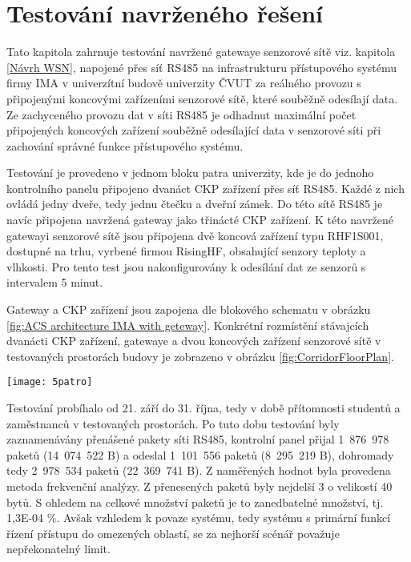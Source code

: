 \chapter{Testování navrženého řešení}
Tato kapitola zahrnuje testování navržené gatewaye senzorové sítě viz. kapitola \ref{Návrh WSN}, napojené přes síť RS485 na infrastrukturu přístupového systému firmy IMA v univerzítní budově univerzity ČVUT za reálného provozu s připojenými koncovými zařízeními senzorové sítě, které souběžně odesílají data. Ze zachyceného provozu dat v síti RS485 je odhadnut maximální počet připojených koncových zařízení souběžně odesílající data v senzorové síti při zachování správné funkce přístupového systému.

Testování je provedeno v jednom bloku patra univerzity, kde je do jednoho kontrolního panelu připojeno dvanáct CKP zařízení přes síť RS485. Každé z nich ovládá jedny dveře, tedy jednu čtečku a dveřní zámek.
Do této sítě RS485 je navíc připojena navržená gateway jako třinácté CKP zařízení.
K této navržené gatewayi senzorové sítě jsou připojena dvě koncová zařízení typu RHF1S001, dostupné na trhu, vyrbené firmou RisingHF, obsahující senzory teploty a vlhkosti. Pro tento test jsou nakonfigurovány k odesílání dat ze senzorů s intervalem 5 minut.

Gateway a CKP zařízení jsou zapojena dle blokového schematu v obrázku \ref{fig:ACS architecture IMA with geteway}.
Konkrétní rozmístění stávajcích dvanácti CKP zařízení, gatewaye a dvou koncových zařízení senzorové sítě v testovaných prostorách budovy je zobrazeno v obrázku \ref{fig:CorridorFloorPlan}.

\begin{figure*}[!ht]
    \centering
    \texttt{[image: 5patro]}
    \caption{Rozmístění koncových zařízení sítě a zařízení CKP v testovaných prostorách budovy}
    \label{fig:CorridorFloorPlan}
\end{figure*}

Testování probíhalo od 21. září do 31. října, tedy v době přítomnosti studentů a zaměstnanců v testovaných prostorách. 
Po tuto dobu testování byly zaznamenávány přenášené pakety síti RS485, kontrolní panel přijal 1~876~978 paketů (14~074~522 B) a odeslal 1~101~556 paketů (8~295~219 B), dohromady tedy 2~978~534 paketů (22~369~741 B).
Z naměřených hodnot byla provedena metoda frekvenční analýzy. Z přenesených paketů byly nejdelší 3 o velikostí 40 bytů.
S ohledem na celkové množství paketů je to zanedbatelné množství, tj. 1,3E-04 \%.
Avšak vzhledem k povaze systému, tedy systému s primární funkcí řízení přístupu do omezených oblastí, se za nejhorší scénář považuje nepřekonatelný limit.

